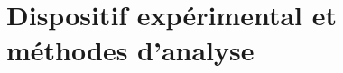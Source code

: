 \chapter{Dispositif expérimental et méthodes d’analyse}
\label{chap:disp.exp}
\minitoc

%
%
%
%
%
%
%
%
%

